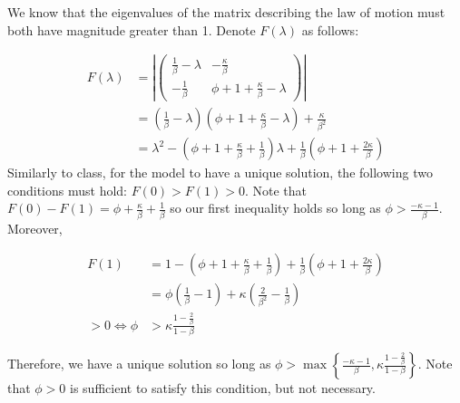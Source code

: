 \documentclass[11pt]{article} %
\begin{document}
We know that the eigenvalues of the matrix describing the law of motion must both have magnitude greater than 1. Denote $F(\lambda)$ as follows:

\begin{align*}
F(\lambda)  &= \left|  \begin{pmatrix} \frac{1}{\beta} - \lambda &  -\frac{\kappa }{\beta}  \\ -\frac{1}{\beta}  & \phi + 1 + \frac{\kappa}{\beta} - \lambda  \end{pmatrix} \right|\\
&= \left(  \frac{1 }{\beta} - \lambda \right) \left( \phi + 1 + \frac{\kappa}{\beta} - \lambda \right) + \frac{\kappa}{\beta^2} \\
&= \lambda^2 - \left( \phi + 1 + \frac{\kappa}{\beta} + \frac{1}{\beta}\right)\lambda + \frac{1}{\beta}\left( \phi + 1 + \frac{2\kappa}{\beta}  \right) 
\end{align*}
 Similarly to class, for the model to have a unique solution, the following two conditions must hold: $F(0)>F(1) > 0$. Note that $F(0) - F(1) = \phi + \frac{\kappa}{\beta} + \frac{1}{\beta} $ so our first inequality holds so long as $\phi>\frac{-\kappa - 1}{\beta}$. Moreover,

\begin{align*}
F(1) &=  1 - \left(\phi + 1 + \frac{\kappa}{\beta} + \frac{1}{\beta}\right) + \frac{1}{\beta}\left( \phi + 1 + \frac{2\kappa}{\beta}  \right) \\
&= \phi \left( \frac{1}{\beta} - 1\right) + \kappa \left( \frac{2}{\beta^2}  - \frac{1}{\beta}\right)\\
>0 \iff \phi &> \kappa\frac{1-\frac{2}{\beta}}{1-\beta}
\end{align*}

Therefore, we have a unique solution so long as $\phi > \max\left\{ \frac{-\kappa - 1}{\beta} ,  \kappa\frac{1-\frac{2}{\beta}}{1-\beta}\right\}$. Note that $\phi>0$ is sufficient to satisfy this condition, but not necessary.
\end{document}
